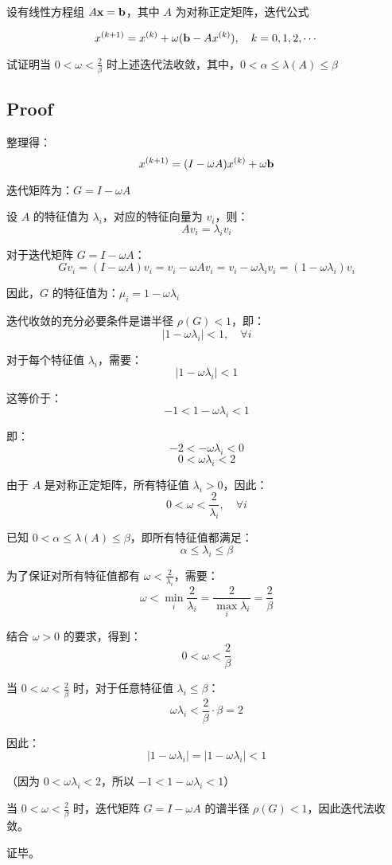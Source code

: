 \documentclass[11pt]{article}
\begin{document}
设有线性方程组 \(A\bold{x} = \bold{b}\)，其中 \(A\)
为对称正定矩阵，迭代公式

\[
x^{(k + 1)} = x^{(k)} + \omega (\bold{b} - Ax^{(k)}), \quad k = 0, 1, 2, \cdots
\]

试证明当 \(0 < \omega < \frac{2}{\beta}\)
时上述迭代法收敛，其中，\(0 < \alpha \le \lambda(A) \le \beta\)

    \subsection{Proof}\label{proof}

整理得： \[x^{(k + 1)} = (I - \omega A)x^{(k)} + \omega \bold{b}\]

迭代矩阵为：\(G = I - \omega A\)

设 \(A\) 的特征值为 \(\lambda_i\)，对应的特征向量为 \(v_i\)，则：
\[Av_i = \lambda_i v_i\]

对于迭代矩阵 \(G = I - \omega A\)：
\[Gv_i = (I - \omega A)v_i = v_i - \omega Av_i = v_i - \omega \lambda_i v_i = (1 - \omega \lambda_i)v_i\]

因此，\(G\) 的特征值为：\(\mu_i = 1 - \omega \lambda_i\)

迭代收敛的充分必要条件是谱半径 \(\rho(G) < 1\)，即：
\[|1 - \omega \lambda_i| < 1, \quad \forall i\]

对于每个特征值 \(\lambda_i\)，需要： \[|1 - \omega \lambda_i| < 1\]

这等价于： \[-1 < 1 - \omega \lambda_i < 1\]

即： \[-2 < -\omega \lambda_i < 0\] \[0 < \omega \lambda_i < 2\]

由于 \(A\) 是对称正定矩阵，所有特征值 \(\lambda_i > 0\)，因此：
\[0 < \omega < \frac{2}{\lambda_i}, \quad \forall i\]

已知 \(0 < \alpha \le \lambda(A) \le \beta\)，即所有特征值都满足：
\[\alpha \le \lambda_i \le \beta\]

为了保证对所有特征值都有 \(\omega < \frac{2}{\lambda_i}\)，需要：
\[\omega < \min_i \frac{2}{\lambda_i} = \frac{2}{\max_i \lambda_i} = \frac{2}{\beta}\]

结合 \(\omega > 0\) 的要求，得到： \[0 < \omega < \frac{2}{\beta}\]

当 \(0 < \omega < \frac{2}{\beta}\) 时，对于任意特征值
\(\lambda_i \le \beta\)：
\[\omega \lambda_i < \frac{2}{\beta} \cdot \beta = 2\]

因此： \[|1 - \omega \lambda_i| = |1 - \omega \lambda_i| < 1\]

（因为 \(0 < \omega \lambda_i < 2\)，所以
\(-1 < 1 - \omega \lambda_i < 1\)）

当 \(0 < \omega < \frac{2}{\beta}\) 时，迭代矩阵 \(G = I - \omega A\)
的谱半径 \(\rho(G) < 1\)，因此迭代法收敛。

证毕。


    
    
    
\end{document}
